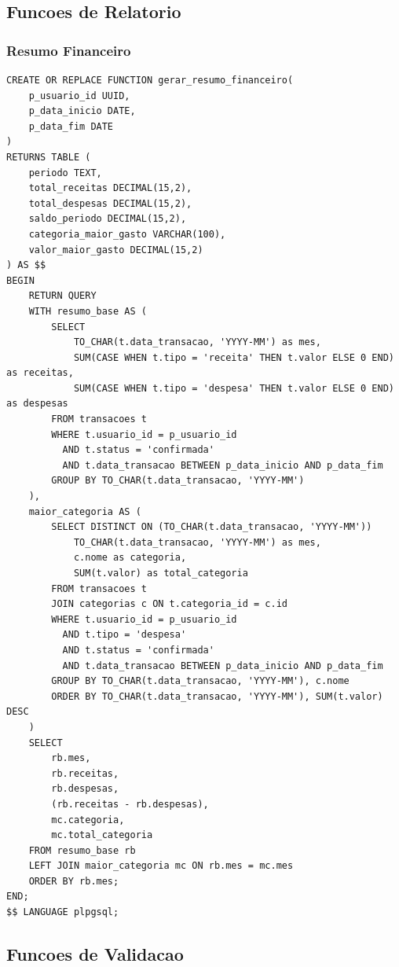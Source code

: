 \subsection{Funcoes de Relatorio}

\subsubsection{Resumo Financeiro}

\begin{lstlisting}[caption=Funcao para gerar resumo financeiro]
CREATE OR REPLACE FUNCTION gerar_resumo_financeiro(
    p_usuario_id UUID,
    p_data_inicio DATE,
    p_data_fim DATE
)
RETURNS TABLE (
    periodo TEXT,
    total_receitas DECIMAL(15,2),
    total_despesas DECIMAL(15,2),
    saldo_periodo DECIMAL(15,2),
    categoria_maior_gasto VARCHAR(100),
    valor_maior_gasto DECIMAL(15,2)
) AS $$
BEGIN
    RETURN QUERY
    WITH resumo_base AS (
        SELECT 
            TO_CHAR(t.data_transacao, 'YYYY-MM') as mes,
            SUM(CASE WHEN t.tipo = 'receita' THEN t.valor ELSE 0 END) as receitas,
            SUM(CASE WHEN t.tipo = 'despesa' THEN t.valor ELSE 0 END) as despesas
        FROM transacoes t
        WHERE t.usuario_id = p_usuario_id
          AND t.status = 'confirmada'
          AND t.data_transacao BETWEEN p_data_inicio AND p_data_fim
        GROUP BY TO_CHAR(t.data_transacao, 'YYYY-MM')
    ),
    maior_categoria AS (
        SELECT DISTINCT ON (TO_CHAR(t.data_transacao, 'YYYY-MM'))
            TO_CHAR(t.data_transacao, 'YYYY-MM') as mes,
            c.nome as categoria,
            SUM(t.valor) as total_categoria
        FROM transacoes t
        JOIN categorias c ON t.categoria_id = c.id
        WHERE t.usuario_id = p_usuario_id
          AND t.tipo = 'despesa'
          AND t.status = 'confirmada'
          AND t.data_transacao BETWEEN p_data_inicio AND p_data_fim
        GROUP BY TO_CHAR(t.data_transacao, 'YYYY-MM'), c.nome
        ORDER BY TO_CHAR(t.data_transacao, 'YYYY-MM'), SUM(t.valor) DESC
    )
    SELECT 
        rb.mes,
        rb.receitas,
        rb.despesas,
        (rb.receitas - rb.despesas),
        mc.categoria,
        mc.total_categoria
    FROM resumo_base rb
    LEFT JOIN maior_categoria mc ON rb.mes = mc.mes
    ORDER BY rb.mes;
END;
$$ LANGUAGE plpgsql;
\end{lstlisting}

\subsection{Funcoes de Validacao}

